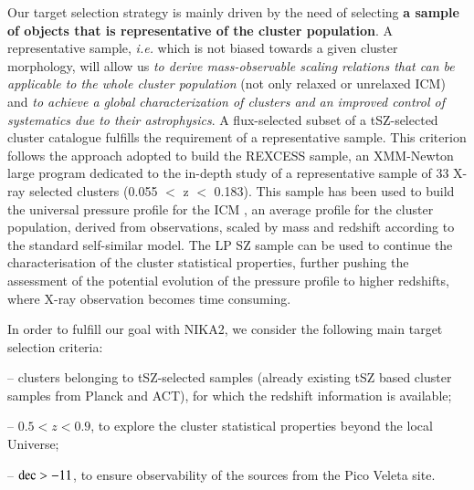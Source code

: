\documentclass[11pt,a4paper,twoside,graphicx,color]{article}
\newcommand{\emp}[1]{\emph{#1}}
\newcommand{\laurence}[1]{#1}
\begin{document}
Our target selection strategy is mainly driven by the need of
selecting {\bf a sample of objects that is representative of the
  cluster population}.
\laurence{A representative sample, {\it i.e.} which is not biased towards a given
cluster morphology, will allow us \emp{to derive mass-observable
  scaling relations that can be applicable to the whole cluster
  population} (not only relaxed or unrelaxed ICM) and \emp{to achieve
  a global characterization of clusters and an improved control of
  systematics due to their astrophysics}. A flux-selected subset of a
tSZ-selected cluster catalogue fulfills the requirement of a
representative sample.}
%
This criterion follows
the approach adopted to build the REXCESS sample, an XMM-Newton large
program dedicated to the in-depth study of a representative sample of
33 X-ray selected clusters (0.055 $<$ z $<$ 0.183). This sample has been used to
build the universal pressure profile for the ICM \cite{Arnaud2010}, an
average profile for the cluster population, derived from observations,
scaled by mass and redshift according to the standard self-similar
model.
The LP SZ sample can be used to continue the  
characterisation of the cluster statistical properties, further
pushing the assessment of the potential evolution of the pressure
profile to higher redshifts, where X-ray observation becomes time consuming.

In order to fulfill our goal with NIKA2, we consider the following
main target selection criteria:

-- clusters belonging to tSZ-selected samples (already existing tSZ
based cluster samples from Planck and ACT), for which the redshift
information is available;

-- $0.5 < z < 0.9$, to explore the cluster statistical properties
beyond the local Universe;

-- $\rm{dec} > -11$, to ensure observability of the sources from the Pico
Veleta site.

\end{document}
